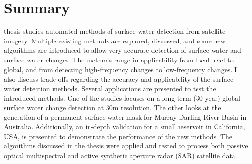 \chapter*{Summary}

 thesis studies automated methods of surface water detection from satellite imagery. Multiple existing methods are explored, discussed, and some new algorithms are introduced to allow very accurate detection of surface water and surface water changes. 
The methods range in applicability from local level to global, and from detecting high-frequency changes to low-frequency changes. 
I also discuss trade-offs regarding the accuracy and applicability of the surface water detection methods. Several applications are presented to test the introduced methods. One of the studies focuses on a long-term (30 year) global surface water change detection at 30m resolution. The other looks at the generation of a permanent surface water mask for Murray-Darling River Basin in Australia. Additionally, an in-depth validation for a small reservoir in California, USA, is presented to demonstrate the performance of the new methods. 
The algorithms discussed in the thesis were applied and tested to process both passive optical multispectral and active synthetic aperture radar (SAR) satellite data.
